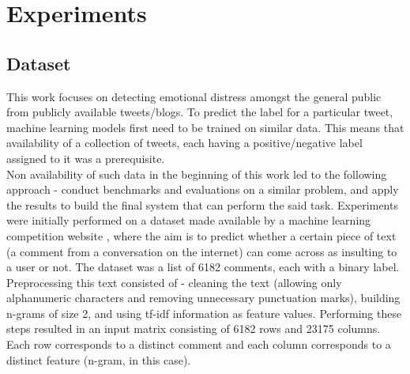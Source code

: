 \chapter{Experiments}
\label{chapter:Experiments}


\section{Dataset}
This work focuses on detecting emotional distress amongst the general public from publicly available tweets/blogs. To predict the label for a particular tweet, machine learning models first need to be trained on similar data. This means that availability of a collection of tweets, each having a positive/negative label assigned to it was a prerequisite.\\

Non availability of such data in the beginning of this work led to the following approach - conduct benchmarks and evaluations on a similar problem, and apply the results to build the final system that can perform the said task. Experiments were initially performed on a dataset made available by a machine learning competition website \cite{kaggle}, where the aim is to predict whether a certain piece of text (a comment from a conversation on the internet) can come across as insulting to a user or not. The dataset was a list of 6182 comments, each with a binary label.\\

Preprocessing this text consisted of - cleaning the text (allowing only alphanumeric characters and removing unnecessary punctuation marks), building n-grams of size 2, and using tf-idf information as feature values. Performing these steps resulted in an input matrix consisting of 6182 rows and 23175 columns. Each row corresponds to a distinct comment and each column corresponds to a distinct feature (n-gram, in this case).\\

